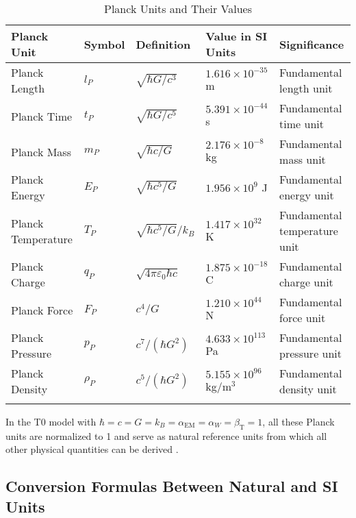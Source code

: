 \documentclass[12pt,a4paper]{article}
\newcommand{\alphaEM}{\alpha_{\text{EM}}}
\newcommand{\betaT}{\beta_{\text{T}}}
\begin{document}
	\begin{table}[ht]
		\centering
		\begin{adjustbox}{scale=0.75}
			\begin{tabular}{lllll}
				\hline
				\textbf{Planck Unit} & \textbf{Symbol} & \textbf{Definition} & \textbf{Value in SI Units} & \textbf{Significance} \\
				\hline
				Planck Length & $l_P$ & $\sqrt{\hbar G/c^3}$ & $1.616 \times 10^{-35}$ m & Fundamental length unit \\
				Planck Time & $t_P$ & $\sqrt{\hbar G/c^5}$ & $5.391 \times 10^{-44}$ s & Fundamental time unit \\
				Planck Mass & $m_P$ & $\sqrt{\hbar c/G}$ & $2.176 \times 10^{-8}$ kg & Fundamental mass unit \\
				Planck Energy & $E_P$ & $\sqrt{\hbar c^5/G}$ & $1.956 \times 10^9$ J & Fundamental energy unit \\
				Planck Temperature & $T_P$ & $\sqrt{\hbar c^5/G}/k_B$ & $1.417 \times 10^{32}$ K & Fundamental temperature unit \\
				Planck Charge & $q_P$ & $\sqrt{4\pi\varepsilon_0\hbar c}$ & $1.875 \times 10^{-18}$ C & Fundamental charge unit \\
				Planck Force & $F_P$ & $c^4/G$ & $1.210 \times 10^{44}$ N & Fundamental force unit \\
				Planck Pressure & $p_P$ & $c^7/(\hbar G^2)$ & $4.633 \times 10^{113}$ Pa & Fundamental pressure unit \\
				Planck Density & $\rho_P$ & $c^5/(\hbar G^2)$ & $5.155 \times 10^{96}$ kg/m$^3$ & Fundamental density unit \\
				\hline
				\multicolumn{4}{c}{} \\
				\hline
			\end{tabular}
		\end{adjustbox}
		\caption{Planck Units and Their Values}
		\label{tab:planck_units}
	\end{table}
	
	In the T0 model with $\hbar = c = G = k_B = \alphaEM = \alpha_W = \betaT = 1$, all these Planck units are normalized to 1 and serve as natural reference units from which all other physical quantities can be derived \cite{pascher_planck_2025}.
	
	\subsection{Conversion Formulas Between Natural and SI Units}
	
\end{document}
